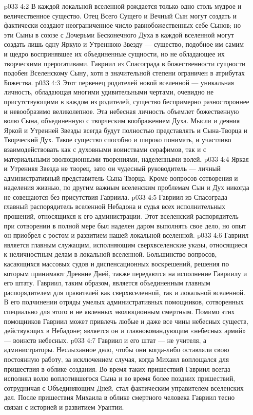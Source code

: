 \vs p033 4:2 В каждой локальной вселенной рождается только одно столь мудрое и величественное существо. Отец Всего Сущего и Вечный Сын могут создать и фактически создают неограниченное число равнобожественных себе Сынов; но эти Сыны в союзе с Дочерьми Бесконечного Духа в каждой вселенной могут создать лишь одну Яркую и Утреннюю Звезду --- существо, подобное им самим и щедро воспринявшее их объединенные сущности, но не обладающее их творческими прерогативами. Гавриил из Спасограда в божественности сущности подобен Вселенскому Сыну, хотя в значительной степени ограничен в атрибутах Божества.
\vs p033 4:3 Этот первенец родителей новой вселенной --- уникальная личность, обладающая многими удивительными чертами, очевидно не присутствующими в каждом из родителей, существо беспримерно разностороннее и невообразимо великолепное. Эта небесная личность объемлет божественную волю Сына, объединенную с творческим воображением Духа. Мысли и деяния Яркой и Утренней Звезды всегда будут полностью представлять и Сына\hyp{}Творца и Творческий Дух. Такое существо способно и широко понимать, и участливо взаимодействовать как с духовными воинствами серафимов, так и с материальными эволюционными творениями, наделенными волей.
\vs p033 4:4 \pc Яркая и Утренняя Звезда не творец, зато он чудесный руководитель --- личный административный представитель Сына\hyp{}Творца. Кроме вопросов сотворения и наделения жизнью, по другим важным вселенским проблемам Сын и Дух никогда не совещаются без присутствия Гавриила.
\vs p033 4:5 Гавриил из Спасограда --- главный распорядитель вселенной Небадона и судья всех исполнительных прошений, относящихся к его администрации. Этот вселенский распорядитель при сотворении в полной мере был наделен даром выполнять свое дело, но опыт он приобрел с ростом и развитием нашей локальной вселенной.
\vs p033 4:6 Гавриил является главным служащим, исполняющим сверхвселенские указы, относящиеся к неличностным делам в локальной вселенной. Большинство вопросов, касающихся массовых судов и диспенсационных воскрешений, решения по которым принимают Древние Дней, также передаются на исполнение Гавриилу и его штату. Гавриил, таким образом, является объединенным главным распорядителем для правителей как сверхвселенной, так и локальной вселенной. В его подчинении отряды умелых административных помощников, сотворенных специально для этого и не явленных эволюционным смертным. Помимо этих помощников Гавриил может привлечь любые и даже все чины небесных существ, действующих в Небадоне; является он и главнокомандующим «небесных армий» --- воинств небесных.
\vs p033 4:7 \pc Гавриил и его штат --- не учителя, а администраторы. Неслыханное дело, чтобы они когда\hyp{}либо оставляли свою постоянную работу, за исключением случая, когда Михаил воплощался для пришествия в облике создания. Во время таких пришествий Гавриил всегда исполнял волю воплотившегося Сына и во время более поздних пришествий, сотрудничая с Объединяющим Дней, стал фактическим управителем вселенских дел. После пришествия Михаила в облике смертного человека Гавриил тесно связан с историей и развитием Урантии.

